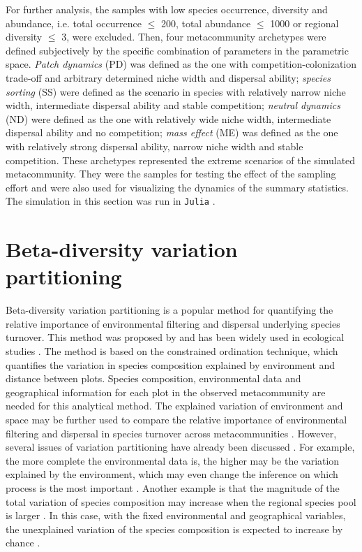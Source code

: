 	For further analysis, the samples with low species occurrence, diversity and abundance, i.e. total occurrence $\leq$ 200, total abundance $\leq$ 1000 or regional diversity $\leq$ 3, were excluded. Then, four metacommunity archetypes were defined subjectively by the specific combination of parameters in the parametric space. \textit{Patch dynamics} (PD) was defined as the one with competition-colonization trade-off and arbitrary determined niche width and dispersal ability; \textit{species sorting} (SS) were defined as the scenario in species with relatively narrow niche width, intermediate dispersal ability and stable competition; \textit{neutral dynamics} (ND) were defined as the one with relatively wide niche width, intermediate dispersal ability and no competition; \textit{mass effect} (ME) was defined as the one with relatively strong dispersal ability, narrow niche width and stable competition. These archetypes represented the extreme scenarios of the simulated metacommunity. They were the samples for testing the effect of the sampling effort and were also used for visualizing the dynamics of the summary statistics. The simulation in this section was run in \texttt{Julia} \citep{bezanson2017julia}.
	
	\section{Beta-diversity variation partitioning}
	\noindent
	\label{sec:VP}
	Beta-diversity variation partitioning is a popular method for quantifying the relative importance of environmental filtering and dispersal underlying species turnover. This method was proposed by \citet{borcard1992partialling} and has been widely used in ecological studies \citep{cottenie2005integrating, peres2006variation, smith2010variation}. The method is based on the constrained ordination technique, which quantifies the variation in species composition explained by environment and distance between plots. Species composition, environmental data and geographical information for each plot in the observed metacommunity are needed for this analytical method. The explained variation of environment and space may be further used to compare the relative importance of environmental filtering and dispersal in species turnover across metacommunities \citep{cottenie2005integrating}. However, several issues of variation partitioning have already been discussed \citep[chap.~4]{leibold2017metacommunity}. For example, the more complete the environmental data is, the higher may be the variation explained by the environment, which may even change the inference on which process is the most important \citep{chang2013better}. Another example is that the magnitude of the total variation of species composition may increase when the regional species pool is larger \citep{kraft2011disentangling}. In this case, with the fixed environmental and geographical variables, the unexplained variation of the species composition is expected to increase by chance \citep[pp.~124]{leibold2017metacommunity}.
	
